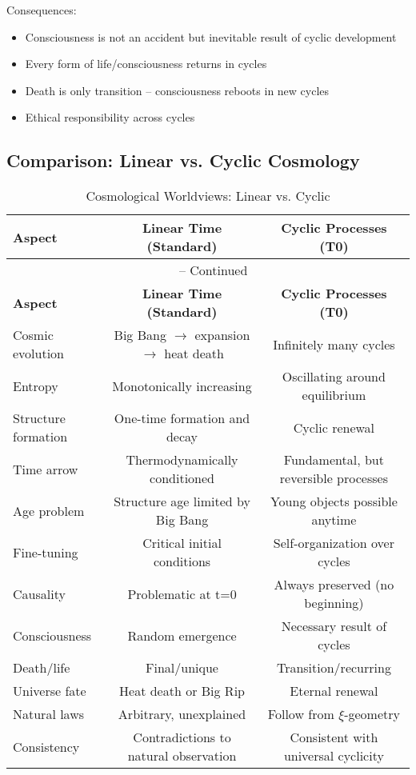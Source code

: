 \documentclass[12pt,a4paper]{article}
\theoremstyle{definition}
\begin{document}
	Consequences:
	\begin{itemize}
		\item Consciousness is not an accident but inevitable result of cyclic development
		\item Every form of life/consciousness returns in cycles
		\item Death is only transition -- consciousness reboots in new cycles
		\item Ethical responsibility across cycles
	\end{itemize}
	
	\subsection{Comparison: Linear vs. Cyclic Cosmology}
	
	\begin{longtable}{lcc}
		\caption{Cosmological Worldviews: Linear vs. Cyclic} \\
		\toprule
		\textbf{Aspect} & \textbf{Linear Time (Standard)} & \textbf{Cyclic Processes (T0)} \\
		\midrule
		\endfirsthead
		\multicolumn{3}{c}{\tablename\ \thetable{} -- Continued} \\
		\toprule
		\textbf{Aspect} & \textbf{Linear Time (Standard)} & \textbf{Cyclic Processes (T0)} \\
		\midrule
		\endhead
		Cosmic evolution & Big Bang $\to$ expansion $\to$ heat death & Infinitely many cycles \\
		Entropy & Monotonically increasing & Oscillating around equilibrium \\
		Structure formation & One-time formation and decay & Cyclic renewal \\
		Time arrow & Thermodynamically conditioned & Fundamental, but reversible processes \\
		Age problem & Structure age limited by Big Bang & Young objects possible anytime \\
		Fine-tuning & Critical initial conditions & Self-organization over cycles \\
		Causality & Problematic at t=0 & Always preserved (no beginning) \\
		Consciousness & Random emergence & Necessary result of cycles \\
		Death/life & Final/unique & Transition/recurring \\
		Universe fate & Heat death or Big Rip & Eternal renewal \\
		Natural laws & Arbitrary, unexplained & Follow from $\xi$-geometry \\
		Consistency & Contradictions to natural observation & Consistent with universal cyclicity \\
		\bottomrule
	\end{longtable}
	
\end{document}
